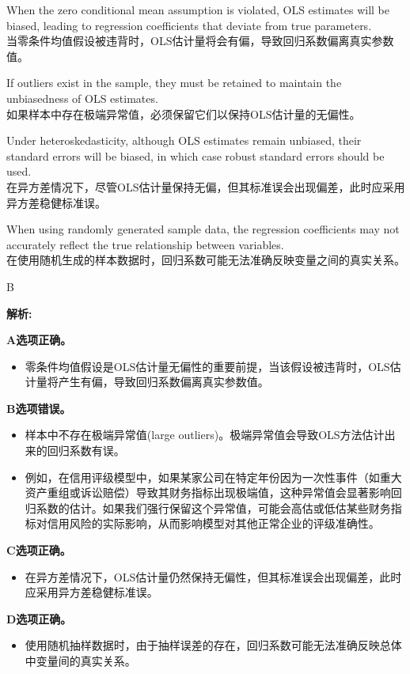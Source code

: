 \documentclass{article}
\newenvironment{explanation}
{\textbf{解析:}\par}
{\par}
\begin{document}
\begin{choices}
    \item When the zero conditional mean assumption is violated, OLS estimates will be biased, leading to regression coefficients that deviate from true parameters.\\
    当零条件均值假设被违背时，OLS估计量将会有偏，导致回归系数偏离真实参数值。
    \item If outliers exist in the sample, they must be retained to maintain the unbiasedness of OLS estimates.\\
    如果样本中存在极端异常值，必须保留它们以保持OLS估计量的无偏性。
    \item Under heteroskedasticity, although OLS estimates remain unbiased, their standard errors will be biased, in which case robust standard errors should be used.\\
    在异方差情况下，尽管OLS估计量保持无偏，但其标准误会出现偏差，此时应采用异方差稳健标准误。
    \item When using randomly generated sample data, the regression coefficients may not accurately reflect the true relationship between variables.\\
    在使用随机生成的样本数据时，回归系数可能无法准确反映变量之间的真实关系。
\end{choices}

\begin{correctanswer}
B
\end{correctanswer}

\begin{explanation}
\textbf{A选项正确。}
\begin{itemize}
    \item 零条件均值假设是OLS估计量无偏性的重要前提，当该假设被违背时，OLS估计量将产生有偏，导致回归系数偏离真实参数值。
\end{itemize}

\textbf{B选项错误。}
\begin{itemize}
    \item 样本中不存在极端异常值(large outliers)。极端异常值会导致OLS方法估计出来的回归系数有误。
    \item 例如，在信用评级模型中，如果某家公司在特定年份因为一次性事件（如重大资产重组或诉讼赔偿）导致其财务指标出现极端值，这种异常值会显著影响回归系数的估计。如果我们强行保留这个异常值，可能会高估或低估某些财务指标对信用风险的实际影响，从而影响模型对其他正常企业的评级准确性。
\end{itemize}

\textbf{C选项正确。}
\begin{itemize}
    \item 在异方差情况下，OLS估计量仍然保持无偏性，但其标准误会出现偏差，此时应采用异方差稳健标准误。
\end{itemize}

\textbf{D选项正确。}
\begin{itemize}
    \item 使用随机抽样数据时，由于抽样误差的存在，回归系数可能无法准确反映总体中变量间的真实关系。
\end{itemize}
\end{explanation}
\end{document}
